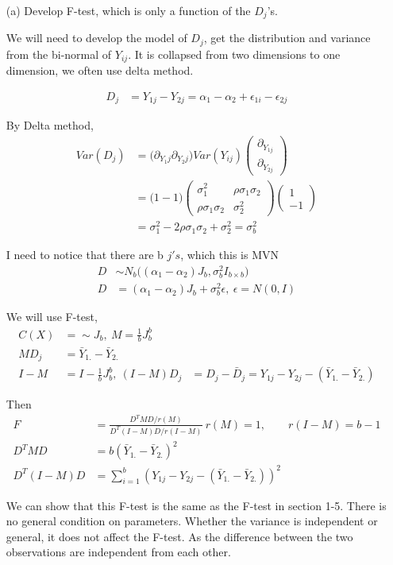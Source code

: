  \begin{itemize}
 \item[(a)] Develop F-test, which is only a function of the $D_j$'s. 
 
 We will need to develop the model of $D_j$, get the distribution and variance from the bi-normal of $Y_{ij}$. It is collapsed from two dimensions to one dimension, we often use delta method. 
 
\begin{align*}
 D_j &= Y_{1j} - Y_{2j} = \alpha_{1} - \alpha_{2} + \epsilon_{1i} - \epsilon_{2j}
 \end{align*}
 
 By Delta method,
 \begin{align*}
 Var(D_j) &=  \Big( \partial_{Y_1j}  \partial_{Y_2j} \Big) Var(Y_{ij}) \begin{pmatrix} \partial_{Y_{1j}} \\  \partial_{Y_{2j}} \end{pmatrix} \\
 &=  \Big( 1  -1 \Big) \begin{pmatrix} \sigma_1^2 & \rho \sigma_1 \sigma_2 \\ \rho \sigma_1 \sigma_2 &  \sigma_2^2  \end{pmatrix} \begin{pmatrix} 1 \\  -1 \end{pmatrix} \\
 &= \sigma_1^2 - 2\rho \sigma_1 \sigma_2 + \sigma_2^2 = \sigma_b^2
 \end{align*}
 
 I need to notice that there are b $j's$, which this is MVN
  \begin{align*}
  D & \sim  N_b \Big( (\alpha_1 - \alpha_2) J_b,  \sigma_b^2 I_{b \times b} \Big) \\
  D &= (\alpha_1 - \alpha_2) J_b + \sigma_b^2 \epsilon, \
  \epsilon = N(0, I)
 \end{align*}
 
  We will use F-test,
  \begin{align*}
  C(X) &=  \sim  J_b, \
  M = \frac{1}{b} J_b^b \\
  M D_j &= \bar{Y}_{1.} - \bar{Y}_{2.} \\
  I-M &= I - \frac{1}{b} J_b^b ,\
  (I-M) D_j &= D_j - \bar{D}_j = Y_{1j} - Y_{2j} - (\bar{Y}_{1.} - \bar{Y}_{2.})
  \end{align*}
 
 Then 
   \begin{align*}
  F &=  \frac{D^T M D \Big / r(M)}{D^T (I-M) D \Big / r(I-M)} \
  r(M) = 1, \qquad r(I-M) = b-1\\
  D^T M D &= b (\bar{Y}_{1.} - \bar{Y}_{2.} )^2 \\
  D^T (I-M) D &= \sum_{i=1}^b (Y_{1j} - Y_{2j} - (\bar{Y}_{1.} - \bar{Y}_{2.}))^2
  \end{align*}
  
  We can show that this F-test is the same as the F-test in section 1-5. There is no general condition on parameters. Whether the variance is independent or general, it does not affect the F-test. As the difference between the two observations are independent from each other.
  
 \end{itemize}
 
 